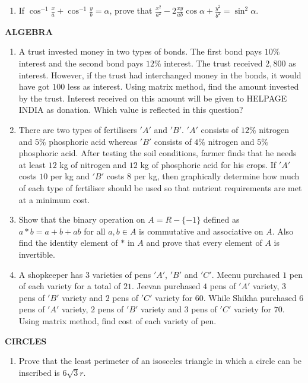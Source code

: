 \documentclass[12pt,-letter paper]{article}
\begin{document}
\begin{enumerate}
\item If $\cos^{-1}\frac{x}{a}+\cos^{-1}\frac{y}{b}=\alpha$, prove that $\frac{x^2}{a^2}-2\frac{xy}{ab}\cos\alpha+\frac{y^2}{b^2}=\sin^2\alpha$.
\end{enumerate}
\begin{center}
	\textbf{ALGEBRA}
\end{center}
\begin{enumerate}
\item A trust invested money in two types of bonds. The first bond pays $10\%$ interest and the second bond pays $12\%$ interest. The trust received \rupee$2,800$ as interest. However, if the trust had interchanged money in the bonds, it would have got \rupee$100$ less as interest. Using matrix method, find the amount invested by the trust. Interest received on this amount will be given to HELPAGE INDIA as donation. Which value is reflected in this question? 
\item There are two types of fertilisers $'A'$ and $'B'$. $'A'$ consists of $12\%$ nitrogen and $5\%$ phosphoric acid whereas $'B'$ consists of $4\%$ nitrogen and $5\%$ phosphoric acid. After testing the soil conditions, farmer finds that he needs at least $12$ kg of nitrogen and $12$ kg of phosphoric acid for his crops. If $'A'$ costs $10$ per kg and $'B'$ costs $8$ per kg, then graphically determine how much of each type of fertiliser should be used so that nutrient requirements are met at a minimum cost.
\item Show that the binary operation on $A=R-\{-1\}$ defined as $a*b=a+b+ab$ for all $a, b \in A$ is commutative and associative on $A$. Also find the identity element of $*$ in $A$ and prove that every element of $A$ is invertible.
\item A shopkeeper has $3$ varieties of pens $'A'$, $'B'$ and $'C'$. Meenu purchased $1$ pen of each variety for a total of \rupee$21$. Jeevan purchased $4$ pens of $'A'$ variety, $3$ pens of $'B'$ variety and $2$ pens of $'C'$ variety for \rupee$60$. While Shikha purchased 6 pens of $'A'$ variety, $2$ pens of $'B'$ variety and $3$ pens of $'C'$ variety for \rupee$70$. Using matrix method, find cost of each variety of pen.
\end{enumerate}
\begin{center}
	\textbf{CIRCLES}
\end{center}
\begin{enumerate}
\item Prove that the least perimeter of an isosceles triangle in which a circle can be inscribed is 
$6\sqrt{3}r$.

\end{enumerate}
\end{document}
